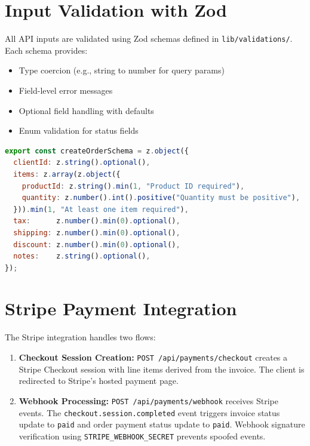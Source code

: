 \documentclass[12pt,a4paper]{report}
\begin{document}
\section{Input Validation with Zod}

All API inputs are validated using Zod schemas defined in \texttt{lib/validations/}. Each schema provides:
\begin{itemize}[leftmargin=1.5em]
  \item Type coercion (e.g., string to number for query params)
  \item Field-level error messages
  \item Optional field handling with defaults
  \item Enum validation for status fields
\end{itemize}

\begin{lstlisting}[language=JavaScript,caption={Example Zod schema for order creation}]
export const createOrderSchema = z.object({
  clientId: z.string().optional(),
  items: z.array(z.object({
    productId: z.string().min(1, "Product ID required"),
    quantity: z.number().int().positive("Quantity must be positive"),
  })).min(1, "At least one item required"),
  tax:      z.number().min(0).optional(),
  shipping: z.number().min(0).optional(),
  discount: z.number().min(0).optional(),
  notes:    z.string().optional(),
});
\end{lstlisting}

\section{Stripe Payment Integration}

The Stripe integration handles two flows:

\begin{enumerate}[leftmargin=1.5em]
  \item \textbf{Checkout Session Creation:} \texttt{POST /api/payments/checkout} creates a Stripe Checkout session with line items derived from the invoice. The client is redirected to Stripe's hosted payment page.
  \item \textbf{Webhook Processing:} \texttt{POST /api/payments/webhook} receives Stripe events. The \texttt{checkout.session.completed} event triggers invoice status update to \texttt{paid} and order payment status update to \texttt{paid}. Webhook signature verification using \texttt{STRIPE\_WEBHOOK\_SECRET} prevents spoofed events.
\end{enumerate}
\end{document}

